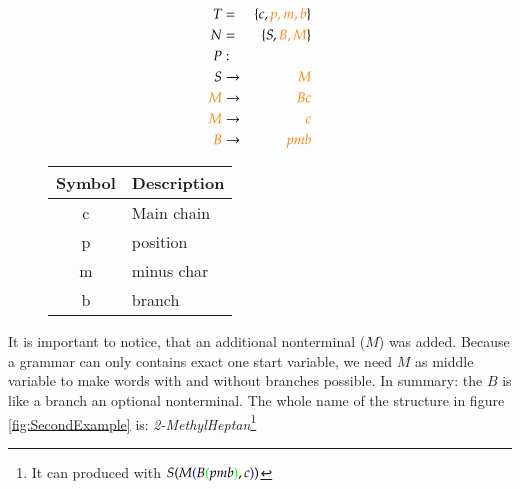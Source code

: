 \documentclass[a4paper,10pt]{article}
\newcommand{\gerquot}[1]{\glqq#1\grqq}
\newcommand{\dashAndSpace}{\textendash \space}
\newcommand{\dashAndSpaceSeq}[1]{\dashAndSpace#1 \textendash}
\newcommand{\captionVSpace}{\vspace*{-0.05cm}}
\newcommand{\CFGDefinitionSize}{0.60}
\newcommand{\SymbolDescriptionTable}{0.35}
\newcommand{\colorBracketFirstNesting}{black}
\newcommand{\colorBracketSecondNesting}{blue}
\newcommand{\colorBracketThirdNesting}{green}
\newcommand{\colorNew}{orange}
\begin{document}
\begin{figure}[H]
    \begin{minipage}[l]{\CFGDefinitionSize\textwidth}
        $$
        \begin{aligned}
            T &=& \{c, {\color{\colorNew}p, m, b}\} \\
            N &=& \{S, {\color{\colorNew}B, M}\} \\
            P &:& \\
            S &\rightarrow& {\color{\colorNew}M} \\
            {\color{\colorNew}M} &\rightarrow& {\color{\colorNew}Bc} \\
            {\color{\colorNew}M} &\rightarrow& {\color{\colorNew}c} \\
            {\color{\colorNew}{B}} &\rightarrow& {\color{\colorNew}pmb} \\
        \end{aligned}
        $$
        \caption{CFG with exact one branch. $B \rightarrow pmb$ is an optional production rule.}
        \label{fig:CFGWithExactOneBranch}
    \end{minipage}
    \begin{minipage}[r]{\SymbolDescriptionTable\textwidth}
        \begin{table}[H]
        \centering
            \begin{tabular}{c|l}
                \toprule
                \textbf{Symbol} & \textbf{Description} \\
                \midrule
                c & Main chain \\
                p & position \\
                m & minus char \\
                b & branch \\
                \bottomrule
            \end{tabular}
        \end{table}
    \end{minipage}
\end{figure}

It is important to notice, that an additional nonterminal ($M$) was added. Because a grammar can only contains exact one start variable, we need $M$ as \gerquot{middle variable} to make words with and without branches possible. In summary: the $B$ is \dashAndSpaceSeq{like a branch} an optional nonterminal.
The whole name of the structure in figure \ref{fig:SecondExample} is: \emph{2-MethylHeptan}\footnote{It can produced with
$
S
{\color{\colorBracketFirstNesting}{(}}
    M
    {\color{\colorBracketSecondNesting}{(}}
        B
        {\color{\colorBracketThirdNesting}{(}}
            pmb
        {\color{\colorBracketThirdNesting}{)}}
        , c
    {\color{\colorBracketSecondNesting}{)}}
{\color{\colorBracketFirstNesting}{)}}
$}
\end{document}

